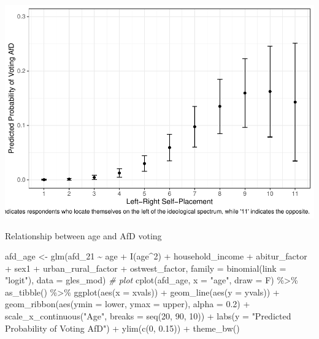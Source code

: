 \documentclass[
]{article}
\newenvironment{Shaded}{\begin{snugshade}}{\end{snugshade}}
\newcommand{\AttributeTok}[1]{\textcolor[rgb]{0.77,0.63,0.00}{#1}}
\newcommand{\CommentTok}[1]{\textcolor[rgb]{0.56,0.35,0.01}{\textit{#1}}}
\newcommand{\DecValTok}[1]{\textcolor[rgb]{0.00,0.00,0.81}{#1}}
\newcommand{\FloatTok}[1]{\textcolor[rgb]{0.00,0.00,0.81}{#1}}
\newcommand{\FunctionTok}[1]{\textcolor[rgb]{0.00,0.00,0.00}{#1}}
\newcommand{\NormalTok}[1]{#1}
\newcommand{\OtherTok}[1]{\textcolor[rgb]{0.56,0.35,0.01}{#1}}
\newcommand{\SpecialCharTok}[1]{\textcolor[rgb]{0.00,0.00,0.00}{#1}}
\newcommand{\StringTok}[1]{\textcolor[rgb]{0.31,0.60,0.02}{#1}}
\begin{document}
\includegraphics{AVCD_Final_Assignment-Edenhofer_latest_files/figure-latex/afd-left-right-self-placement-1.pdf}

Relationship between age and AfD voting

\begin{Shaded}
\begin{Highlighting}[]
\NormalTok{afd\_age }\OtherTok{\textless{}{-}} \FunctionTok{glm}\NormalTok{(afd\_21 }\SpecialCharTok{\textasciitilde{}}\NormalTok{ age }\SpecialCharTok{+} \FunctionTok{I}\NormalTok{(age}\SpecialCharTok{\^{}}\DecValTok{2}\NormalTok{) }\SpecialCharTok{+}\NormalTok{ household\_income }\SpecialCharTok{+}\NormalTok{ abitur\_factor }\SpecialCharTok{+}\NormalTok{ sex1 }\SpecialCharTok{+}\NormalTok{ urban\_rural\_factor }\SpecialCharTok{+}\NormalTok{ ostwest\_factor, }\AttributeTok{family =} \FunctionTok{binomial}\NormalTok{(}\AttributeTok{link =} \StringTok{"logit"}\NormalTok{), }\AttributeTok{data =}\NormalTok{ gles\_mod)}
\CommentTok{\# plot }
\FunctionTok{cplot}\NormalTok{(afd\_age, }\AttributeTok{x =} \StringTok{"age"}\NormalTok{, }\AttributeTok{draw =}\NormalTok{ F) }\SpecialCharTok{\%\textgreater{}\%}
  \FunctionTok{as\_tibble}\NormalTok{() }\SpecialCharTok{\%\textgreater{}\%}
  \FunctionTok{ggplot}\NormalTok{(}\FunctionTok{aes}\NormalTok{(}\AttributeTok{x =}\NormalTok{ xvals)) }\SpecialCharTok{+}
  \FunctionTok{geom\_line}\NormalTok{(}\FunctionTok{aes}\NormalTok{(}\AttributeTok{y =}\NormalTok{ yvals)) }\SpecialCharTok{+}
  \FunctionTok{geom\_ribbon}\NormalTok{(}\FunctionTok{aes}\NormalTok{(}\AttributeTok{ymin =}\NormalTok{ lower, }\AttributeTok{ymax =}\NormalTok{ upper), }\AttributeTok{alpha =} \FloatTok{0.2}\NormalTok{) }\SpecialCharTok{+}
  \FunctionTok{scale\_x\_continuous}\NormalTok{(}\StringTok{"Age"}\NormalTok{, }\AttributeTok{breaks =} \FunctionTok{seq}\NormalTok{(}\DecValTok{20}\NormalTok{, }\DecValTok{90}\NormalTok{, }\DecValTok{10}\NormalTok{)) }\SpecialCharTok{+}
  \FunctionTok{labs}\NormalTok{(}\AttributeTok{y =} \StringTok{"Predicted Probability of Voting AfD"}\NormalTok{) }\SpecialCharTok{+}
  \FunctionTok{ylim}\NormalTok{(}\FunctionTok{c}\NormalTok{(}\DecValTok{0}\NormalTok{, }\FloatTok{0.15}\NormalTok{)) }\SpecialCharTok{+}
  \FunctionTok{theme\_bw}\NormalTok{()}
\end{Highlighting}
\end{Shaded}
\end{document}
